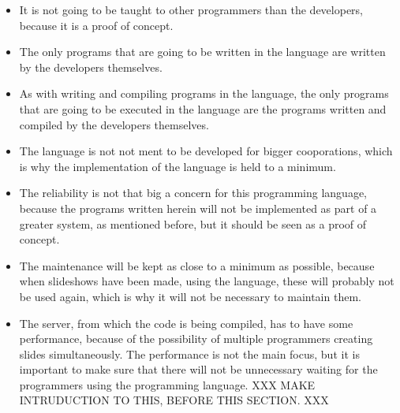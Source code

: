 \begin{itemize}
	\item It is not going to be taught to other programmers than the developers, because it is a proof of concept.
	\item The only programs that are going to be written in the language are written by the developers themselves.
	\item As with writing and compiling programs in the language, the only programs that are going to be executed in the language are the programs written and compiled by the developers themselves.
  \item The language is not not ment to be developed for bigger cooporations, which is why the implementation of the language is held to a minimum.
	\item The reliability is not that big a concern for this programming language, because the programs written herein will not be implemented as part of a greater system, as mentioned before, but it should be seen as a proof of concept.
	\item The maintenance will be kept as close to a minimum as possible, because when slideshows have been made, using the language, these will probably not be used again, which is why it will not be necessary to maintain them.
	\item The server, from which the code is being compiled, has to have some performance, because of the possibility of multiple programmers creating slides simultaneously. The performance is not the main focus, but it is important to make sure that there will not be unnecessary waiting for the programmers using the programming language. XXX MAKE INTRUDUCTION TO THIS, BEFORE THIS SECTION. XXX
\end{itemize}


